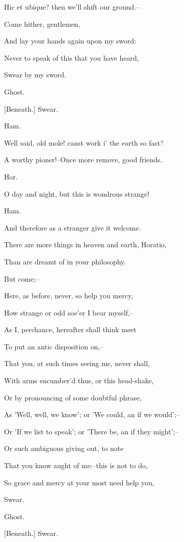 \documentclass[12pt]{book}
\begin{document}
Hic et ubique? then we'll shift our ground.--

Come hither, gentlemen,

And lay your hands again upon my sword:

Never to speak of this that you have heard,

Swear by my sword.



Ghost.

[Beneath.] Swear.



Ham.

Well said, old mole! canst work i' the earth so fast?

A worthy pioner!--Once more remove, good friends.



Hor.

O day and night, but this is wondrous strange!



Ham.

And therefore as a stranger give it welcome.

There are more things in heaven and earth, Horatio,

Than are dreamt of in your philosophy.

But come;--

Here, as before, never, so help you mercy,

How strange or odd soe'er I bear myself,--

As I, perchance, hereafter shall think meet

To put an antic disposition on,--

That you, at such times seeing me, never shall,

With arms encumber'd thus, or this head-shake,

Or by pronouncing of some doubtful phrase,

As 'Well, well, we know'; or 'We could, an if we would';--

Or 'If we list to speak'; or 'There be, an if they might';--

Or such ambiguous giving out, to note

That you know aught of me:--this is not to do,

So grace and mercy at your most need help you,

Swear.



Ghost.

[Beneath.] Swear.
\end{document}
